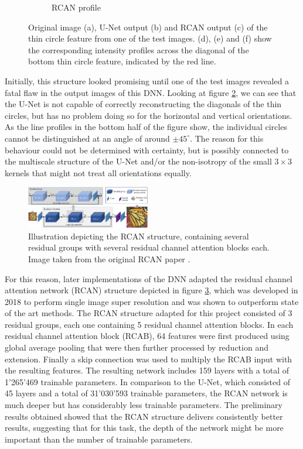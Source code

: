 \documentclass[conference]{IEEEtran}
\begin{document}
\begin{figure}[h!]
\begin{subfigure}[b]{0.149\textwidth}
        \caption{RCAN profile}
        \label{fig:rcan_circle_cut}
    \end{subfigure}
    \caption{Original image (a), U-Net output (b) and RCAN output (c) of the thin circle feature from one of the test images. (d), (e) and (f) show the corresponding intensity profiles across the diagonal of the bottom thin circle feature, indicated by the red line.}
    \label{fig:circle_comp}
\end{figure}

Initially, this structure looked promising until one of the test images revealed a fatal flaw in the output images of this DNN. Looking at figure \ref{fig:circle_comp}, we can see that the U-Net is not capable of correctly reconstructing the diagonals of the thin circles, but has no problem doing so for the horizontal and vertical orientations. As the line profiles in the bottom half of the figure show, the individual circles cannot be distinguished at an angle of around $\pm45^\circ$. The reason for this behaviour could not be determined with certainty, but is possibly connected to the multiscale structure of the U-Net and/or the non-isotropy of the small $3\times 3$ kernels that might not treat all orientations equally.

\begin{figure}[h]
    \centering
    \includegraphics[width=0.48\textwidth]{images/rcan_structure.png}
    \caption{Illustration depicting the RCAN structure, containing several residual groups with several residual channel attention blocks each. Image taken from the original RCAN paper \cite{zhang2018rcan}.}
    \label{fig:rcan_structure}
\end{figure}

For this reason, later implementations of the DNN adapted the residual channel attention network (RCAN) structure \cite{zhang2018rcan} depicted in figure \ref{fig:rcan_structure}, which was developed in 2018 to perform single image super resolution and was shown to outperform state of the art methods. The RCAN structure adapted for this project consisted of 3 residual groups, each one containing 5 residual channel attention blocks. In each residual channel attention block (RCAB), 64 features were first produced using global average pooling that were then further processed by reduction and extension. Finally a skip connection was used to multiply the RCAB input with the resulting features. The resulting network includes 159 layers with a total of 1'265'469 trainable parameters. In comparison to the U-Net, which consisted of 45 layers and a total of 31'030'593 trainable parameters, the RCAN network is much deeper but has considerably less trainable parameters. The preliminary results obtained showed that the RCAN structure delivers consistently better results, suggesting that for this task, the depth of the network might be more important than the number of trainable parameters.
\end{document}
